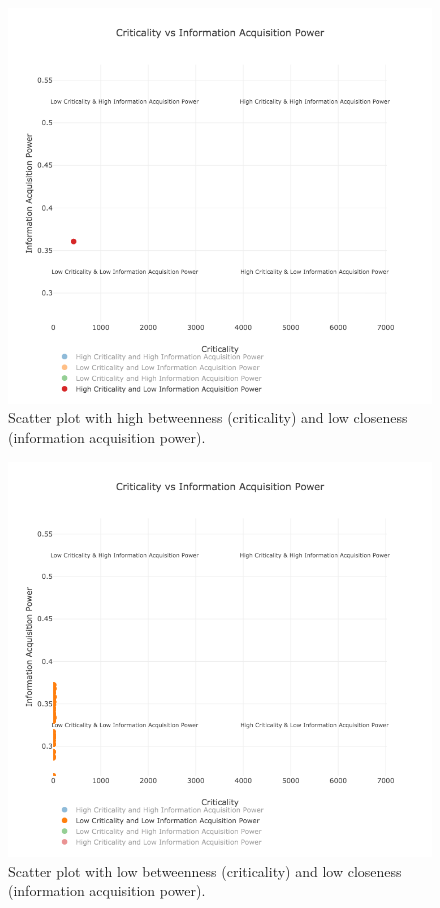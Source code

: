 \documentclass[conference]{IEEEtran}
\begin{document}
\begin{figure}[ht!]
  \includegraphics[width=\linewidth]{scatterplot_red.png}
  \caption{Scatter plot with high betweenness (criticality) and low closeness (information acquisition power).}
  \label{fig:scatterplot_hblc}
\end{figure}

\begin{figure}[ht!]
  \includegraphics[width=\linewidth]{scatterplot_orange.png}
  \caption{Scatter plot with low betweenness (criticality) and low closeness (information acquisition power).}
  \label{fig:scatterplot_lblc}
\end{figure}
\end{document}
